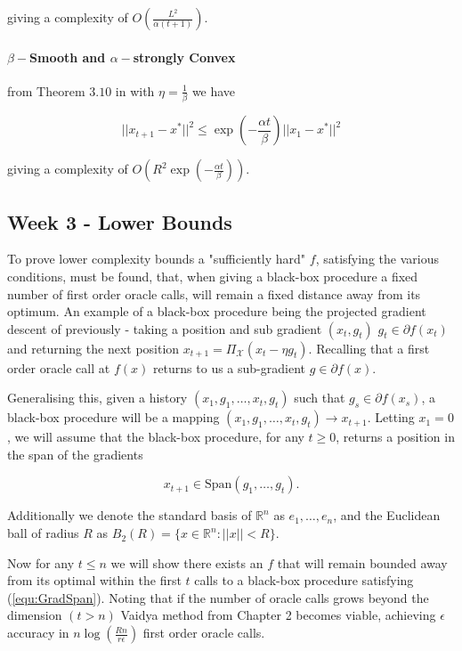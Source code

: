 giving a complexity of $O\left(\frac{L^2}{\alpha (t+1)}\right)$.


\paragraph{$\beta-$Smooth and $\alpha-$strongly Convex} from Theorem $3.10$ in \cite{bubeck} with $\eta = \frac{1}{\beta}$ we have

\begin{equation}
||x_{t+1} - x^* ||^2 \leq \exp\left( - \frac{\alpha t}{\beta}\right) ||x_1 - x^*||^2
\end{equation}


giving a complexity of $O\left( R^2 \exp\left( - \frac{\alpha t}{\beta}\right) \right)$.





\subsection{Week 3 - Lower Bounds}

To prove lower complexity bounds a "sufficiently hard" $f$, satisfying the various conditions, must be found, that, when giving a black-box procedure a fixed number of first order oracle calls, will remain a fixed distance away from its optimum.  An example of a black-box procedure being the projected gradient descent of previously - taking a position and sub gradient $(x_t,g_t)$ $g_t \in \partial f(x_t)$ and returning the next position $x_{t+1} = \Pi_{\mathcal{X}}(x_t - \eta g_t)$. Recalling that a first order oracle call at $f(x)$ returns to us a sub-gradient $g \in \partial f(x)$.


Generalising this, given a history $(x_1,g_1,\dots,x_t,g_t)$ such that $g_s \in \partial f(x_s)$, a black-box procedure will be a mapping $(x_1,g_1,\dots,x_t,g_t) \rightarrow x_{t+1}$.  Letting $x_1 = 0$, we will assume that the black-box procedure, for any $t \geq 0$, returns a position in the span of the gradients

\begin{equation}
x_{t+1} \in \text{Span}(g_1,\dots,g_t).
\label{equ:GradSpan}
\end{equation}


Additionally we denote the standard basis of $\mathbb{R}^n$ as $e_1,\dots,e_n$, and the Euclidean ball of radius $R$ as $B_2(R) = \{x \in \mathbb{R}^n : ||x||<R\}$.  


Now for any $t \leq n$ we will show there exists an $f$ that will remain bounded away from its optimal within the first $t$ calls to a black-box procedure satisfying (\ref{equ:GradSpan}).  Noting that if the number of oracle calls grows beyond the dimension $(t > n)$ Vaidya method from Chapter 2 becomes viable, achieving $\epsilon$ accuracy in $n\log(\frac{Rn}{r \epsilon})$ first order oracle calls.

